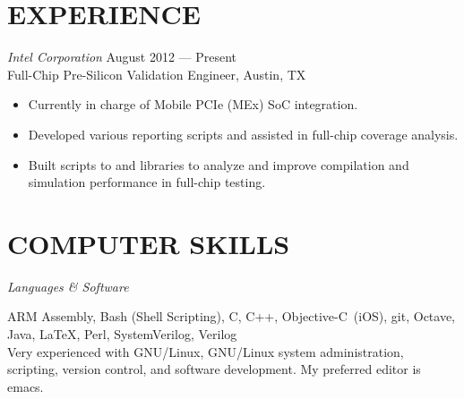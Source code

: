 \documentclass[margin]{res}
\begin{document}
\begin{resume}
  \section{EXPERIENCE} {\sl Intel Corporation}
  \hfill August 2012 --- Present \\
  Full-Chip Pre-Silicon Validation Engineer, Austin, TX
  \vspace{0.25em}
  \begin{itemize}
  \item Currently in charge of Mobile PCIe (MEx) SoC integration.
  \item Developed various reporting scripts and assisted in full-chip
    coverage analysis.
  \item Built scripts to and libraries to analyze and improve
    compilation and simulation performance in full-chip testing.
  \end{itemize}

  \section{COMPUTER SKILLS}
  {\sl Languages \& Software} \\
  \vspace{-1.0em}
  \begin{adjustwidth}{1.5em}{0pt}
    ARM Assembly, Bash (Shell Scripting), C, C++, \mbox{Objective-C
      (iOS)}, git, Octave, Java, \LaTeX, Perl, SystemVerilog, Verilog
    \vspace{0.5em}\\
    Very experienced with GNU/Linux, GNU/Linux system administration,
    scripting, version control, and software development. My preferred
    editor is emacs.
  \end{adjustwidth}


\end{resume}
\end{document}
